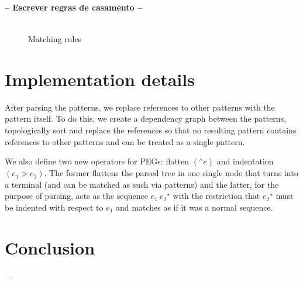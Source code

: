 \textbf{-- Escrever regras de casamento --}
\begin{figure*}[ht]
    \[
        \begin{array}{ccc}








        \end{array}
    \]
    \centering
    \caption{Matching rules}
    \label{fig:matching-rules}
\end{figure*}

\section{Implementation details}\label{sec:implementation-details}

After parsing the patterns, we replace references to other patterns with the 
pattern itself. To do this, we create a dependency graph between the patterns, 
topologically sort and replace the references so that no resulting pattern 
contains references to other patterns and can be treated as a single pattern.

We also define two new operators for PEGs: flatten \((^\wedge e)\) and indentation 
\((e_1 > e_2)\). The former flattens the parsed tree in one single node that turns
into a terminal (and can be matched as such via patterns) and the latter, for the 
purpose of parsing, acts as the sequence \(e_1\:{e_2}^\star\) with the restriction 
that \({e_2}^\star\) must be indented with respect to \(e_1\) and matches as if it 
was a normal sequence.

\section{Conclusion}\label{sec:methodology-conclusion}

---

\cleardoublepage